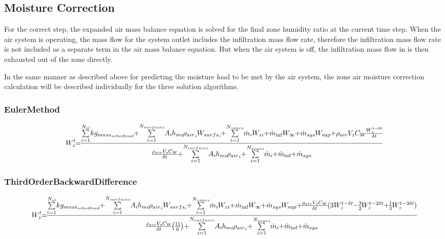 \subsection{Moisture Correction}\label{moisture-correction}

For the correct step, the expanded air mass balance equation is solved for the final zone humidity ratio at the current time step. When the air system is operating, the mass flow for the system outlet includes the infiltration mass flow rate, therefore the infiltration mass flow rate is not included as a separate term in the air mass balance equation. But when the air system is off, the infiltration mass flow in is then exhausted out of the zone directly.

In the same manner as described above for predicting the moisture load to be met by the air system, the zone air moisture correction calculation will be described individually for the three solution algorithms.

\subsubsection{EulerMethod}\label{eulermethod-1-001}

\begin{equation}
\medmuskip=0mu
\thinmuskip=0mu
\thickmuskip=0mu
\nulldelimiterspace=0pt
\scriptspace=0pt
W_z^t = \frac{{\sum\limits_{i = 1}^{{N_{sl}}} {k{g_{mas{s_{sched\;load}}}}}  + \sum\limits_{i = 1}^{{N_{surfaces}}} {{A_i}{h_{mi}}} {\rho_{ai{r_z}}}{W_{surf{s_i}}} + \sum\limits_{i = 1}^{{N_{zones}}} {{{\dot m}_i}} {W_{zi}} + {{\dot m}_{\inf }}{W_\infty } + {{\dot m}_{sys}}{W_{\sup }} + {\rho_{air}}{V_z}{C_W}\frac{{W_z^{t - \delta t}}}{{\delta t}}}}{{\frac{{{\rho_{air}}{V_z}{C_W}}}{{\delta t}} + \sum\limits_{i = 1}^{{N_{surfaces}}} {{A_i}{h_{mi}}{\rho_{ai{r_z}}}}  + \sum\limits_{i = 1}^{{N_{zones}}} {{{\dot m}_i}}  + {{\dot m}_{\inf }} + {{\dot m}_{sys}}}}
\end{equation}

\subsubsection{ThirdOrderBackwardDifference}\label{thirdorderbackwarddifference-1-001}

{\scriptsize
\begin{equation}
\medmuskip=0mu
\thinmuskip=0mu
\thickmuskip=0mu
\nulldelimiterspace=0pt
\scriptspace=0pt
W_z^t = \frac{{\sum\limits_{i = 1}^{{N_{sl}}} {k{g_{mas{s_{sched\;load}}}}}  + \sum\limits_{i = 1}^{{N_{surfaces}}} {{A_i}{h_{mi}}} {\rho_{ai{r_z}}}{W_{surf{s_i}}} + \sum\limits_{i = 1}^{{N_{zones}}} {{{\dot m}_i}} {W_{zi}} + {{\dot m}_{\inf }}{W_\infty } + {{\dot m}_{sys}}{W_{\sup }} + \frac{{{\rho_{air}}{V_z}{C_W}}}{{\delta t}}(3W_z^{t - \delta t} - \frac{3}{2}W_z^{t - 2\delta t} + \frac{1}{3}W_z^{t - 3\delta t})}}{{\frac{{{\rho_{air}}{V_z}{C_W}}}{{\delta t}}\left( {\frac{{11}}{6}} \right) + \sum\limits_{i = 1}^{{N_{surfaces}}} {{A_i}{h_{mi}}{\rho_{ai{r_z}}}}  + \sum\limits_{i = 1}^{{N_{zones}}} {{{\dot m}_i}}  + {{\dot m}_{\inf }} + {{\dot m}_{sys}}}}
\end{equation}}

